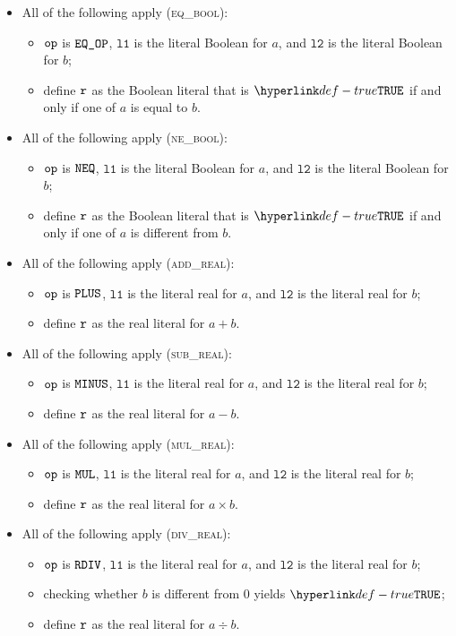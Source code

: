 \documentclass{book}
\newcommand\ProseOrTypeError[0]{\ProseTerminateAs{\TypeErrorConfig}}
\newcommand\vlone[0]{\texttt{l1}}
\newcommand\vltwo[0]{\texttt{l2}}
\begin{document}
\begin{itemize}
  \item All of the following apply (\textsc{eq\_bool}):
  \begin{itemize}
    \item $\texttt{op}$ is $\texttt{EQ\_OP}$, $\vlone$ is the literal Boolean for $a$, and $\vltwo$ is the literal Boolean for $b$;
    \item define $\texttt{r}$ as the Boolean literal that is $\True$ if and only if one of $a$ is equal to $b$.
  \end{itemize}

  \item All of the following apply (\textsc{ne\_bool}):
  \begin{itemize}
    \item $\texttt{op}$ is $\texttt{NEQ}$, $\vlone$ is the literal Boolean for $a$, and $\vltwo$ is the literal Boolean for $b$;
    \item define $\texttt{r}$ as the Boolean literal that is $\True$ if and only if one of $a$ is different from $b$.
  \end{itemize}

  \item All of the following apply (\textsc{add\_real}):
  \begin{itemize}
    \item $\texttt{op}$ is $\texttt{PLUS}$, $\vlone$ is the literal real for $a$, and $\vltwo$ is the literal real for $b$;
    \item define $\texttt{r}$ as the real literal for $a + b$.
  \end{itemize}

  \item All of the following apply (\textsc{sub\_real}):
  \begin{itemize}
    \item $\texttt{op}$ is $\texttt{MINUS}$, $\vlone$ is the literal real for $a$, and $\vltwo$ is the literal real for $b$;
    \item define $\texttt{r}$ as the real literal for $a - b$.
  \end{itemize}

  \item All of the following apply (\textsc{mul\_real}):
  \begin{itemize}
    \item $\texttt{op}$ is $\texttt{MUL}$, $\vlone$ is the literal real for $a$, and $\vltwo$ is the literal real for $b$;
    \item define $\texttt{r}$ as the real literal for $a \times b$.
  \end{itemize}

  \item All of the following apply (\textsc{div\_real}):
  \begin{itemize}
    \item $\texttt{op}$ is $\texttt{RDIV}$, $\vlone$ is the literal real for $a$, and $\vltwo$ is the literal real for $b$;
    \item checking whether $b$ is different from $0$ yields $\True$\ProseOrTypeError;
    \item define $\texttt{r}$ as the real literal for $a \div b$.
  \end{itemize}


\end{itemize}
\end{document}
